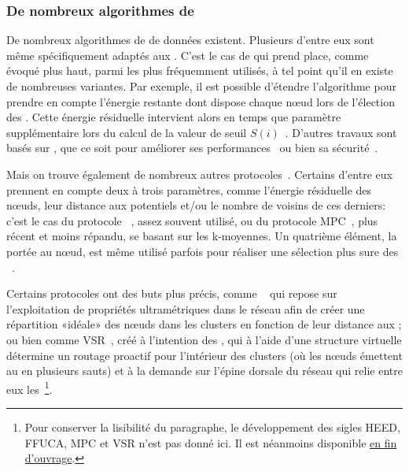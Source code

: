         \subsubsection{De nombreux algorithmes de }
De nombreux algorithmes de  de données existent.
Plusieurs d'entre eux sont même spécifiquement adaptés aux \rcsfs.
C'est le cas de \leach qui prend place, comme évoqué plus haut, parmi les plus fréquemment utilisés, à tel point qu'il en existe de nombreuses variantes.
Par exemple, il est possible d'étendre l'algorithme pour prendre en compte l'énergie restante dont dispose chaque nœud lors de l'élection des \CH.
Cette énergie résiduelle intervient alors en temps que paramètre supplémentaire lors du calcul de la valeur de seuil $S(i)$~\cite{HHT02}.
D'autres travaux sont basés sur \leach, que ce soit pour améliorer ses performances~\cite{RR13,CJ14} ou bien sa sécurité~\cite{OFVWBDL07}.

Mais on trouve également de nombreux autres protocoles~\cite{AY07,DQWH13}.
Certains d'entre eux prennent en compte deux à trois paramètres, comme l'énergie résiduelle des nœuds, leur distance aux \chs potentiels et/ou le nombre de voisins de ces derniers: c'est le cas du protocole \heed~\cite{YF04}, assez souvent utilisé, ou du protocole MPC~\cite{KTAA12}, plus récent et moins répandu, se basant sur les k-moyennes.
Un quatrième élément, la  portée au nœud, est même utilisé parfois pour réaliser une sélection plus sure des \CH~\cite{KMSL09}.

Certains protocoles ont des buts plus précis, comme \ffuca~\cite{FL11,FMMMI12} qui repose sur l'exploitation de propriétés ultramétriques dans le réseau afin de créer une répartition «idéale» des nœuds dans les clusters en fonction de leur distance aux \CH; ou bien comme VSR~\cite{TV08}, créé à l'intention des , qui à l'aide d'une structure virtuelle détermine un routage proactif pour l'intérieur des clusters (où les nœuds émettent au \ch en plusieurs sauts) et à la demande sur l'épine dorsale du réseau qui relie entre eux les \CH\,\footnote{Pour conserver la lisibilité du paragraphe, le développement des sigles HEED, FFUCA, MPC et VSR n'est pas donné ici. Il est néanmoins disponible \hyperref[sigles]{en fin d'ouvrage}.}.

